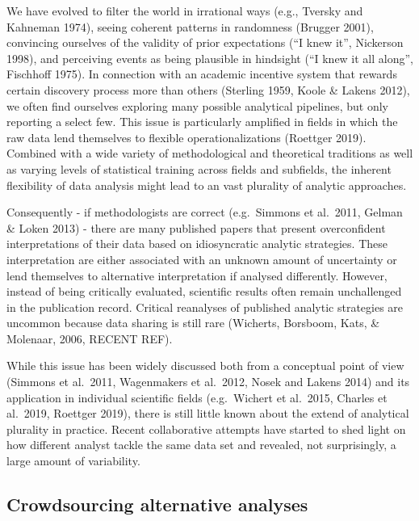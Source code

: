 \documentclass[
  english,
  man]{apa6}
\begin{document}
We have evolved to filter the world in irrational ways (e.g., Tversky and Kahneman 1974), seeing coherent patterns in randomness (Brugger 2001), convincing ourselves of the validity of prior expectations (\enquote{I knew it}, Nickerson 1998), and perceiving events as being plausible in hindsight (\enquote{I knew it all along}, Fischhoff 1975).
In connection with an academic incentive system that rewards certain discovery process more than others (Sterling 1959, Koole \& Lakens 2012), we often find ourselves exploring many possible analytical pipelines, but only reporting a select few.
This issue is particularly amplified in fields in which the raw data lend themselves to flexible operationalizations (Roettger 2019).
Combined with a wide variety of methodological and theoretical traditions as well as varying levels of statistical training across fields and subfields, the inherent flexibility of data analysis might lead to an vast plurality of analytic approaches.

Consequently - if methodologists are correct (e.g.~Simmons et al.~2011, Gelman \& Loken 2013) - there are many published papers that present overconfident interpretations of their data based on idiosyncratic analytic strategies.
These interpretation are either associated with an unknown amount of uncertainty or lend themselves to alternative interpretation if analysed differently.
However, instead of being critically evaluated, scientific results often remain unchallenged in the publication record.
Critical reanalyses of published analytic strategies are uncommon because data sharing is still rare (Wicherts, Borsboom, Kats, \& Molenaar, 2006, RECENT REF).

While this issue has been widely discussed both from a conceptual point of view (Simmons et al.~2011, Wagenmakers et al.~2012, Nosek and Lakens 2014) and its application in individual scientific fields (e.g.~Wichert et al.~2015, Charles et al.~2019, Roettger 2019), there is still little known about the extend of analytical plurality in practice.
Recent collaborative attempts have started to shed light on how different analyst tackle the same data set and revealed, not surprisingly, a large amount of variability.

\hypertarget{crowdsourcing-alternative-analyses}{%
\subsection{Crowdsourcing alternative analyses}\label{crowdsourcing-alternative-analyses}}
\end{document}
